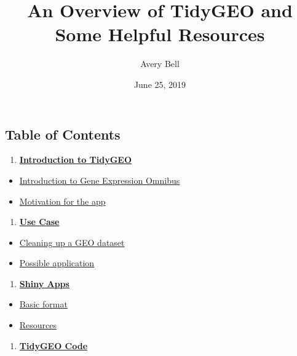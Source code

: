 \documentclass[]{article}
\title{An Overview of TidyGEO and Some Helpful Resources}
\author{Avery Bell}
\date{June 25, 2019}
\providecommand{\tightlist}{%
  \setlength{\itemsep}{0pt}\setlength{\parskip}{0pt}}
\begin{document}
\maketitle

\hypertarget{contents}{\subsection{Table of Contents}\label{contents}}

\begin{enumerate}
\def\labelenumi{\arabic{enumi}.}
\tightlist
\item
  \textbf{\protect\hyperlink{intro-to-tidygeo}{Introduction to TidyGEO}}
\end{enumerate}

\begin{itemize}
\tightlist
\item
  \protect\hyperlink{intro-to-geo}{Introduction to Gene Expression
  Omnibus}
\item
  \protect\hyperlink{app-motivation}{Motivation for the app}
\end{itemize}

\begin{enumerate}
\def\labelenumi{\arabic{enumi}.}
\setcounter{enumi}{1}
\tightlist
\item
  \textbf{\protect\hyperlink{use-case}{Use Case}}
\end{enumerate}

\begin{itemize}
\tightlist
\item
  \protect\hyperlink{geo-cleaning-steps}{Cleaning up a GEO dataset}
\item
  \protect\hyperlink{example}{Possible application}
\end{itemize}

\begin{enumerate}
\def\labelenumi{\arabic{enumi}.}
\setcounter{enumi}{2}
\tightlist
\item
  \textbf{\protect\hyperlink{shiny-apps}{Shiny Apps}}
\end{enumerate}

\begin{itemize}
\tightlist
\item
  \protect\hyperlink{shiny-apps-overview}{Basic format}
\item
  \protect\hyperlink{shiny-apps-resources}{Resources}
\end{itemize}

\begin{enumerate}
\def\labelenumi{\arabic{enumi}.}
\setcounter{enumi}{3}
\tightlist
\item
  \textbf{\protect\hyperlink{tidygeo-code}{TidyGEO Code}}
\end{enumerate}
\end{document}
